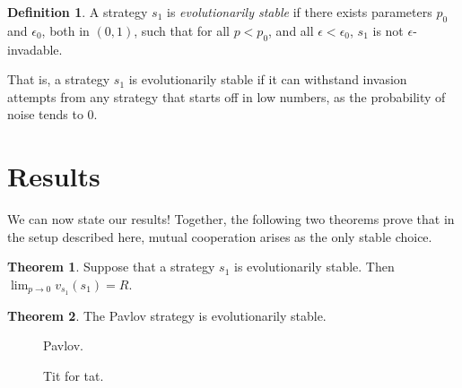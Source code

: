 \documentclass[11pt]{amsart}
\theoremstyle{definition}
\newtheorem{definition}{Definition}
\newtheorem{theorem}{Theorem}
\theoremstyle{remark}
\begin{document}
\begin{definition}
  A strategy $s_1$ is \textit{evolutionarily stable} if there exists parameters $p_0$ and $\epsilon_0$, both in $(0,1)$, such that for all $p < p_0$, and all $\epsilon < \epsilon_0$, $s_1$ is not $\epsilon$-invadable.
\end{definition}

That is, a strategy $s_1$ is evolutionarily stable if it can withstand invasion attempts from any strategy that starts off in low numbers, as the probability of noise tends to 0.

\section{Results}

We can now state our results! Together, the following two theorems prove that in the setup described here, mutual cooperation arises as the only stable choice.

\begin{theorem}
  \label{evolutionarystable1}
  Suppose that a strategy $s_1$ is evolutionarily stable. Then $\lim_{p \to 0} v_{s_1}(s_1) = R$.
\end{theorem}

\begin{theorem}
  \label{pavlovtheorem}
  The Pavlov strategy is evolutionarily stable.
\end{theorem}

\begin{figure}
  \label{pavlovfigure}
  \centering
  \caption{Pavlov.}
\end{figure}

\begin{figure}
  \label{tftfigure}
  \centering
  \caption{Tit for tat.}
\end{figure}
\end{document}
